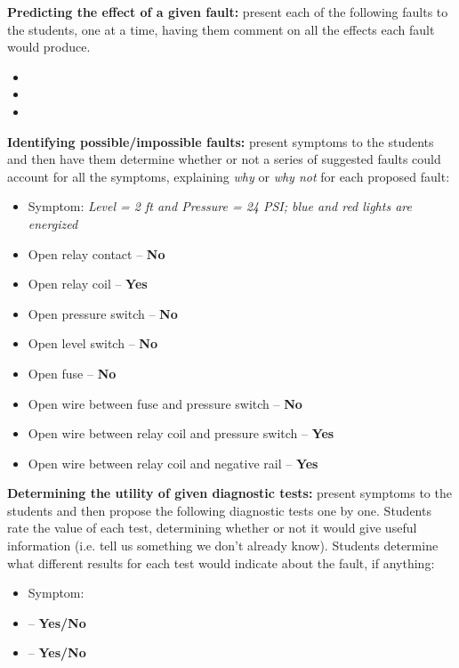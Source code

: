 \noindent
{\bf Predicting the effect of a given fault:} present each of the following faults to the students, one at a time, having them comment on all the effects each fault would produce.

\begin{itemize}
\item{} 
\item{} 
\item{} 
\end{itemize}


\vskip 10pt


\noindent
{\bf Identifying possible/impossible faults:} present symptoms to the students and then have them determine whether or not a series of suggested faults could account for all the symptoms, explaining {\it why} or {\it why not} for each proposed fault:

\begin{itemize}
\item{} Symptom: {\it Level = 2 ft and Pressure = 24 PSI; blue and red lights are energized}
\item{} Open relay contact -- {\bf No}
\item{} Open relay coil -- {\bf Yes}
\item{} Open pressure switch -- {\bf No}
\item{} Open level switch -- {\bf No}
\item{} Open fuse -- {\bf No}
\item{} Open wire between fuse and pressure switch -- {\bf No}
\item{} Open wire between relay coil and pressure switch -- {\bf Yes}
\item{} Open wire between relay coil and negative rail -- {\bf Yes}
\end{itemize}


\vskip 10pt


\noindent
{\bf Determining the utility of given diagnostic tests:} present symptoms to the students and then propose the following diagnostic tests one by one.  Students rate the value of each test, determining whether or not it would give useful information (i.e. tell us something we don't already know).  Students determine what different results for each test would indicate about the fault, if anything:

\begin{itemize}
\item{} Symptom: {\it }
\item{}  -- {\bf Yes/No}
\item{}  -- {\bf Yes/No}
\end{itemize}


